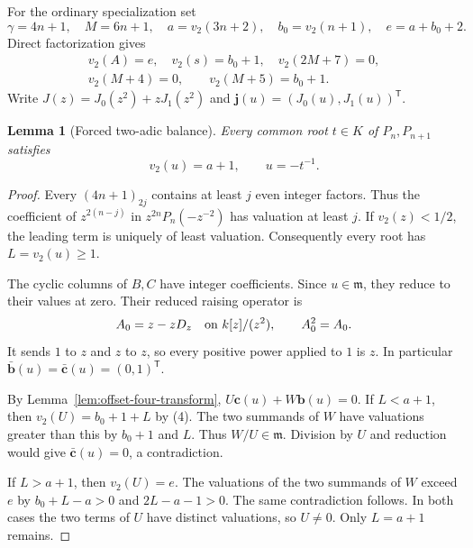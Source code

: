 \documentclass[11pt]{article}
\newtheorem{lemma}{Lemma}
\begin{document}
For the ordinary specialization set
\[
 \gamma=4n+1,\quad M=6n+1,\quad
 a=v_2(3n+2),\quad b_0=v_2(n+1),\quad e=a+b_0+2.
\]
Direct factorization gives
\[
 \begin{gathered}
 v_2(A)=e,\quad v_2(s)=b_0+1,\quad v_2(2M+7)=0,\\
 v_2(M+4)=0,\qquad v_2(M+5)=b_0+1.
 \end{gathered}                                    \tag{4}
\]
Write $J(z)=J_0(z^2)+zJ_1(z^2)$ and
$\mathbf j(u)=(J_0(u),J_1(u))^{\mathsf T}$.

\begin{lemma}[Forced two-adic balance]\label{lem:dyadic-balance}
Every common root $t\in K$ of $P_n,P_{n+1}$ satisfies
\[
 v_2(u)=a+1,\qquad u=-t^{-1}.
\]
\end{lemma}
\begin{proof}
Every $(4n+1)_{2j}$ contains at least $j$ even integer factors.
Thus the coefficient of $z^{2(n-j)}$ in
$z^{2n}P_n(-z^{-2})$ has valuation at least $j$.
If $v_2(z)<1/2$, the leading term is uniquely of least valuation.
Consequently every root has $L=v_2(u)\ge1$.

The cyclic columns of $B,C$ have integer coefficients.
Since $u\in\mathfrak m$, they reduce to their values at zero.
Their reduced raising operator is
\[
 A_0=z-zD_z\quad\hbox{on }k[z]/(z^2),\qquad A_0^2=A_0.
\]
It sends $1$ to $z$ and $z$ to $z$, so every positive power
applied to $1$ is $z$. In particular
$\bar{\mathbf b}(u)=\bar{\mathbf c}(u)=(0,1)^{\mathsf T}$.

By Lemma~\ref{lem:offset-four-transform},
$U\mathbf c(u)+W\mathbf b(u)=0$.
If $L<a+1$, then $v_2(U)=b_0+1+L$ by (4).
The two summands of $W$ have valuations greater than this by
$b_0+1$ and $L$. Thus $W/U\in\mathfrak m$.
Division by $U$ and reduction would give
$\bar{\mathbf c}(u)=0$, a contradiction.

If $L>a+1$, then $v_2(U)=e$. The valuations of the two summands
of $W$ exceed $e$ by $b_0+L-a>0$ and $2L-a-1>0$.
The same contradiction follows. In both cases the two terms of
$U$ have distinct valuations, so $U\ne0$.
Only $L=a+1$ remains.
\end{proof}
\end{document}

